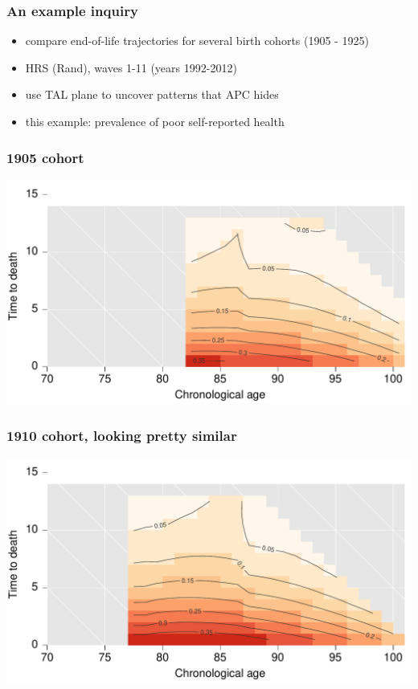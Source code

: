 \documentclass[20pt]{beamer}
\begin{document}
\begin{frame}
\frametitle{An example inquiry}
\normalsize
\begin{itemize}[<+->]
  \item compare end-of-life trajectories for several birth cohorts (1905 - 1925)
  \item HRS (Rand), waves 1-11 (years 1992-2012)
  \item use TAL plane to uncover patterns that APC hides
  \item this example: prevalence of poor self-reported health
\end{itemize}
\end{frame}


\begin{frame}
\frametitle{1905 cohort}
\vspace{-4em}
\begin{center}
\includegraphics[scale=1]{Figures/srhpoor1905.pdf}
\end{center}
\end{frame}


\begin{frame}
\frametitle{1910 cohort, looking pretty similar}
\vspace{-4em}
\begin{center}
\includegraphics[scale=1]{Figures/srhpoor1910.pdf}
\end{center}
\end{frame}
\end{document}

